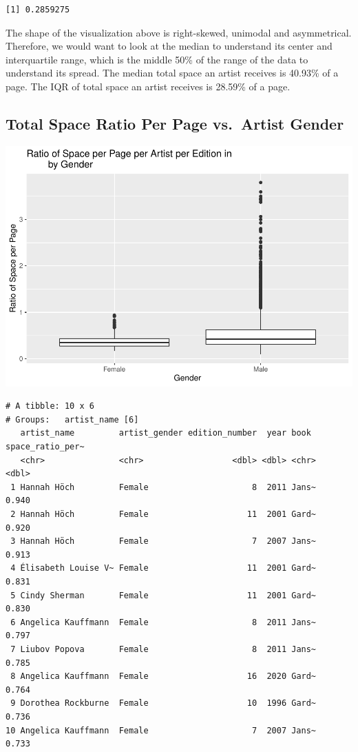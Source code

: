 \documentclass[
  letterpaper,
  DIV=11,
  numbers=noendperiod]{scrreprt}
\begin{document}
\begin{verbatim}
[1] 0.2859275
\end{verbatim}

The shape of the visualization above is right-skewed, unimodal and
asymmetrical. Therefore, we would want to look at the median to
understand its center and interquartile range, which is the middle 50\%
of the range of the data to understand its spread. The median total
space an artist receives is 40.93\% of a page. The IQR of total space an
artist receives is 28.59\% of a page.

\hypertarget{total-space-ratio-per-page-vs.-artist-gender}{%
\subsection{Total Space Ratio Per Page vs.~Artist
Gender}\label{total-space-ratio-per-page-vs.-artist-gender}}

\includegraphics{Chapter1/Chapter1_files/figure-pdf/genderallbooks-1.pdf}

\begin{verbatim}
# A tibble: 10 x 6
# Groups:   artist_name [6]
   artist_name         artist_gender edition_number  year book  space_ratio_per~
   <chr>               <chr>                  <dbl> <dbl> <chr>            <dbl>
 1 Hannah Höch         Female                     8  2011 Jans~            0.940
 2 Hannah Höch         Female                    11  2001 Gard~            0.920
 3 Hannah Höch         Female                     7  2007 Jans~            0.913
 4 Élisabeth Louise V~ Female                    11  2001 Gard~            0.831
 5 Cindy Sherman       Female                    11  2001 Gard~            0.830
 6 Angelica Kauffmann  Female                     8  2011 Jans~            0.797
 7 Liubov Popova       Female                     8  2011 Jans~            0.785
 8 Angelica Kauffmann  Female                    16  2020 Gard~            0.764
 9 Dorothea Rockburne  Female                    10  1996 Gard~            0.736
10 Angelica Kauffmann  Female                     7  2007 Jans~            0.733
\end{verbatim}
\end{document}
